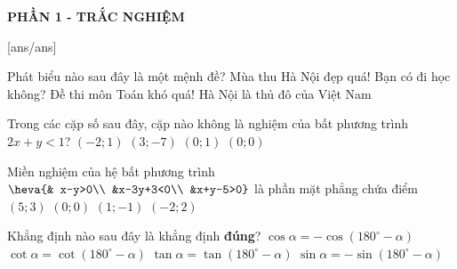 
\begin{center}
	\textbf{PHẦN 1 - TRẮC NGHIỆM}
\end{center}
[ans/ans]
\begin{ex}%
Phát biểu nào sau đây là một mệnh đề?
\choice
{ Mùa thu Hà Nội đẹp quá!}
{Bạn có đi học không?}
{Đề thi môn Toán khó quá!}
{\True Hà Nội là thủ đô của Việt Nam}	
\end{ex}

\begin{ex}%
	Trong các cặp số sau đây, cặp nào không là nghiệm của bất phương trình $2x+y<1$?
	\choice
	{ $(-2 ; 1)$}
	{$(3 ;-7)$}
	{\True $(0 ; 1)$}
	{$(0 ; 0)$}	
\end{ex}

\begin{ex}%
Miền nghiệm của hệ bất phương trình $\heva{&
x-y>0\\ &x-3y+3<0\\ &x+y-5>0}$ là phần mặt phẳng chứa điểm
	\choice
	{\True $(5 ; 3)$}
	{$(0 ; 0)$}
	{$(1 ;-1)$}
	{$(-2 ; 2)$}	
\end{ex}

\begin{ex}%
Khẳng định nào sau đây là khẳng định \textbf{đúng}?
	\choice
	{\True $\cos \alpha=-\cos \left(180^{\circ}-\alpha\right)$}
	{$\cot \alpha=\cot \left(180^{\circ}-\alpha\right)$}
	{$\tan \alpha=\tan \left(180^{\circ}-\alpha\right)$}
	{$\sin \alpha=-\sin \left(180^{\circ}-\alpha\right)$}	
\end{ex}

